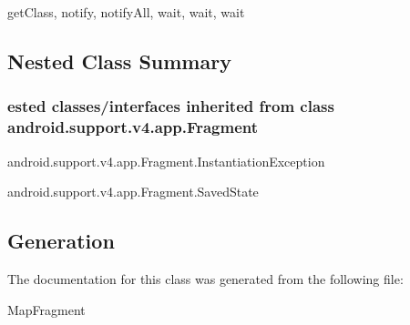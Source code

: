 getClass, notify, notifyAll, wait, wait, wait\\



\subsection{Nested Class Summary}

\subsubsection{ested classes/interfaces inherited from class android.support.v4.app.Fragment}
\begin{DoxyCompactItemize}
\item android.support.v4.app.Fragment.InstantiationException
\item android.support.v4.app.Fragment.SavedState
\end{DoxyCompactItemize} 





\subsection{Generation}
The documentation for this class was generated from the following file\-:
\begin{DoxyCompactItemize}
\item MapFragment
\end{DoxyCompactItemize} 










